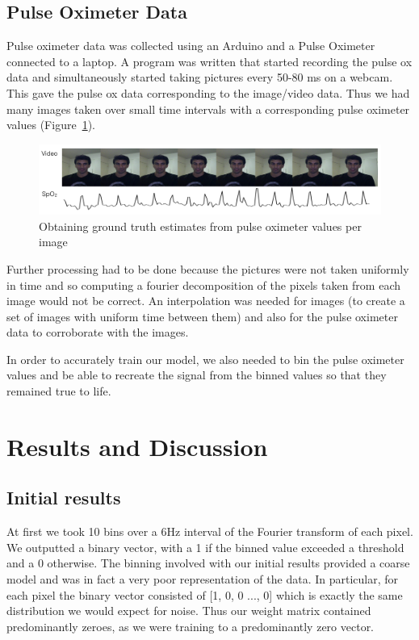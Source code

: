 \documentclass[12pt]{article}
\begin{document}
\subsection*{Pulse Oximeter Data}
  Pulse oximeter data was collected using an Arduino and a Pulse Oximeter connected to a laptop. 
  A program was written that started recording the pulse ox data and simultaneously started taking pictures every 50-80 ms on a webcam.
  This gave the pulse ox data corresponding to the image/video data.
  Thus we had many images taken over small time intervals with a corresponding pulse oximeter values (Figure~\ref{figure:images_and_pulseox}).

  \begin{figure}
    \captionsetup{justification=centering}
    \includegraphics[width=\textwidth]{images/fig3.png}
    \caption{Obtaining ground truth estimates from pulse oximeter values per image \label{figure:images_and_pulseox}}
  \end{figure}

  Further processing had to be done because the pictures were not taken uniformly in time and so computing a fourier decomposition of the pixels taken from each image would not be correct.
  An interpolation was needed for images (to create a set of images with uniform time between them) and also for the pulse oximeter data to corroborate with the images.

  In order to accurately train our model, we also needed to bin the pulse oximeter values and be able to recreate the signal from the binned values so that they remained true to life.
  
  


\section{Results and Discussion}
 \subsection*{Initial results}
  At first we took 10 bins over a 6Hz interval of the Fourier transform of each pixel. We outputted a binary vector, with a 1 if the binned value exceeded a threshold and a 0 otherwise. The binning involved with our initial results provided a coarse model and was in fact a very poor representation of the data. In particular, for each pixel the binary vector consisted of [1, 0, 0 ..., 0] which is exactly the same distribution we would expect for noise. Thus our weight matrix contained predominantly zeroes, as we were training to a predominantly zero vector.
\end{document}
